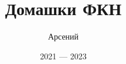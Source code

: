 \documentclass{book}
\begin{document}
	\makeFit

	\title{Домашки ФКН}
	\author{Арсений}
	\date{2021 --- 2023}
	
	\maketitle
	\tableofcontents

	\newpage
	
\end{document}
